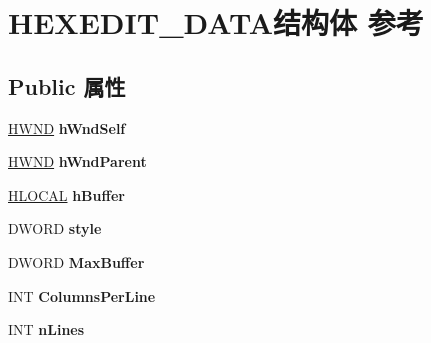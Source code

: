 \hypertarget{struct_h_e_x_e_d_i_t___d_a_t_a}{}\section{H\+E\+X\+E\+D\+I\+T\+\_\+\+D\+A\+T\+A结构体 参考}
\label{struct_h_e_x_e_d_i_t___d_a_t_a}
\subsection*{Public 属性}
\begin{DoxyCompactItemize}
\item 
\mbox{\label{struct_h_e_x_e_d_i_t___d_a_t_a_aa544052ee872094198826ac916ad6101}} 
\hyperlink{interfacevoid}{H\+W\+ND} {\bfseries h\+Wnd\+Self}
\item 
\mbox{\label{struct_h_e_x_e_d_i_t___d_a_t_a_aafd130ea079036730455980f30eb5947}} 
\hyperlink{interfacevoid}{H\+W\+ND} {\bfseries h\+Wnd\+Parent}
\item 
\mbox{\label{struct_h_e_x_e_d_i_t___d_a_t_a_aca8b15b59e4fbb9de3f13a471ac61691}} 
\hyperlink{interfacevoid}{H\+L\+O\+C\+AL} {\bfseries h\+Buffer}
\item 
\mbox{\label{struct_h_e_x_e_d_i_t___d_a_t_a_a61b08de6df74de731fb250334db8a619}} 
D\+W\+O\+RD {\bfseries style}
\item 
\mbox{\label{struct_h_e_x_e_d_i_t___d_a_t_a_a0bf80f0532a2c977959f852d8025a340}} 
D\+W\+O\+RD {\bfseries Max\+Buffer}
\item 
\mbox{\label{struct_h_e_x_e_d_i_t___d_a_t_a_a4ae3967315a15d5d71f868bff3d15e67}} 
I\+NT {\bfseries Columns\+Per\+Line}
\item 
\mbox{\label{struct_h_e_x_e_d_i_t___d_a_t_a_a3fcba8c63649dbb0cf70776e3b507b7d}} 
I\+NT {\bfseries n\+Lines}
\item 
\mbox{\label{struct_h_e_x_e_d_i_t___d_a_t_a_a643624fdaeb776de2d07d28437903186}} 

\end{DoxyCompactItemize}
